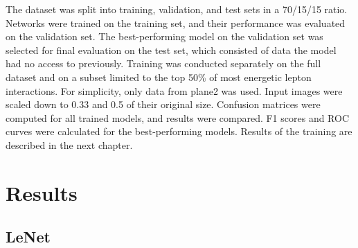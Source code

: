 \documentclass{pracalicmgr}
\begin{document}
The dataset was split into training, validation, and test sets in a 70/15/15 ratio. Networks were trained on the training set, and their performance was evaluated on the validation set. The best-performing model on the validation set was selected for final evaluation on the test set, which consisted of data the model had no access to previously. Training was conducted separately on the full dataset and on a subset limited to the top 50\% of most energetic lepton interactions. For simplicity, only data from plane2 was used. Input images were scaled down to 0.33 and 0.5 of their original size. Confusion matrices were computed for all trained models, and results were compared. F1 scores and ROC curves were calculated for the best-performing models. Results of the training are described in the next chapter.

\section{Results}

\subsection{LeNet}
\end{document}
